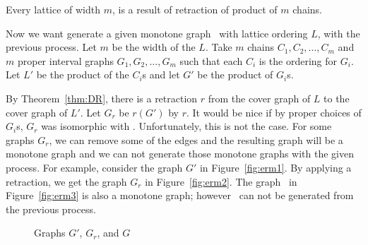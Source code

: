 \begin{cor}
Every lattice of width \(m\), is a result of retraction of product of
\(m\) chains.
\end{cor}

Now we want generate a given monotone graph \mG\ with lattice ordering \(L\),
with the previous process. Let \(m\) be the width of the \(L\)\@.
Take \(m\) chains \(C_1,C_2,\dotsc,C_m\) and \(m\) proper interval graphs
\(G_1,G_2,\dotsc,G_m\) such that each \(C_i\) is the ordering for
\(G_i\)\@.
Let \(L'\) be the product of the \(C_i\)s and let \(G'\)
be the product of \(G_i\)s.

By Theorem~\ref{thm:DR}, there is a retraction \(r\) from the
cover graph of \(L\) to the cover graph of \(L'\)\@.
Let \(G_r\) be \(r(G')\) by \(r\)\@.
It would be nice if by proper choices of \(G_i\)s, \(G_r\)
was isomorphic with \mG\@. Unfortunately, this is not the case.
For some graphs \(G_r\), we can remove some of the edges and
the resulting graph will be a monotone graph and we can not generate those monotone
graphs with the given process. For example, consider the graph \(G'\) in
Figure~\ref{fig:erm1}\@. By applying a retraction, we get the
graph \(G_r\) in Figure~\ref{fig:erm2}\@. The graph
\mG\ in Figure~\ref{fig:erm3} is also a monotone graph; however
\mG\ can not be generated from the previous process\@.

\begin{figure}
\hfill
\subfigure[\ensuremath{G'}]{\label{fig:erm1}}\hfill 
\subfigure[\ensuremath{G_r}]{\label{fig:erm2}}\hfill 
\subfigure[\ensuremath{G}]{\label{fig:erm3}}\hfill 
\caption{Graphs \ensuremath{G'}, \ensuremath{G_r}, and \ensuremath{G}}
\end{figure}